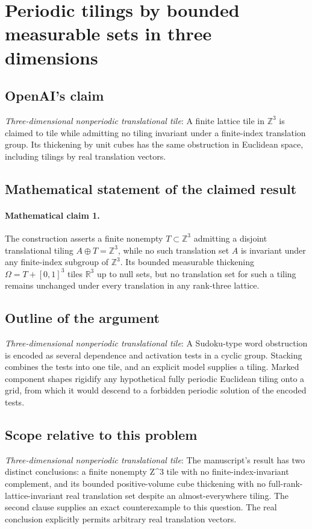 \documentclass[11pt]{article}
\begin{document}
\section*{Periodic tilings by bounded measurable sets in three dimensions}

\subsection{OpenAI's claim}
\textit{Three-dimensional nonperiodic translational tile}: A finite lattice tile in $\mathbb Z^3$ is claimed to tile while admitting no tiling invariant under a finite-index translation group. Its thickening by unit cubes has the same obstruction in Euclidean space, including tilings by real translation vectors.

\subsection{Mathematical statement of the claimed result}
\paragraph{Mathematical claim 1.} The construction asserts a finite nonempty $T\subset\mathbb Z^3$ admitting a disjoint translational tiling $A\oplus T=\mathbb Z^3$, while no such translation set $A$ is invariant under any finite-index subgroup of $\mathbb Z^3$. Its bounded measurable thickening $\Omega=T+[0,1]^3$ tiles $\mathbb R^3$ up to null sets, but no translation set for such a tiling remains unchanged under every translation in any rank-three lattice.

\subsection{Outline of the argument}
\textit{Three-dimensional nonperiodic translational tile}: A Sudoku-type word obstruction is encoded as several dependence and activation tests in a cyclic group. Stacking combines the tests into one tile, and an explicit model supplies a tiling. Marked component shapes rigidify any hypothetical fully periodic Euclidean tiling onto a grid, from which it would descend to a forbidden periodic solution of the encoded tests.

\subsection{Scope relative to this problem}
\textit{Three-dimensional nonperiodic translational tile}: The manuscript’s result has two distinct conclusions: a finite nonempty Z\textasciicircum{}3 tile with no finite-index-invariant complement, and its bounded positive-volume cube thickening with no full-rank-lattice-invariant real translation set despite an almost-everywhere tiling. The second clause supplies an exact counterexample to this question. The real conclusion explicitly permits arbitrary real translation vectors.
\end{document}
